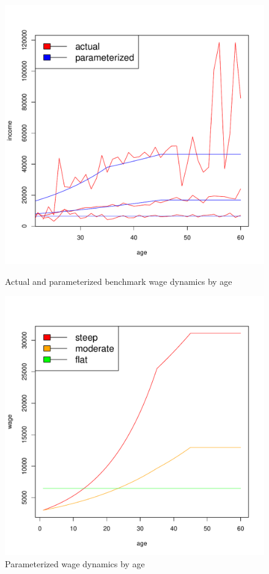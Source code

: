 \documentclass[]{elsarticle}
\begin{document}
\begin{figure}[h]
	\centering
    \begin{minipage}{0.45\textwidth}
		\centering
		\includegraphics[scale=0.4]{figs/heterwage.pdf}
		\caption{Actual and parameterized benchmark wage dynamics by age}
	\end{minipage}
	\hfill
    \begin{minipage}{0.45\textwidth}
		\centering
		\includegraphics[scale=0.4]{figs/heterwageless.pdf}
		\caption{Parameterized wage dynamics by age}
	\end{minipage}

\end{figure}
\end{document}
